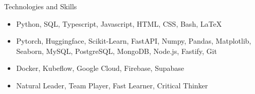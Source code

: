 \documentclass[]{mcdowellcv}
\begin{document}
	\begin{cvsection}{Technologies and Skills}
		\begin{cvsubsection}{}{}{}	
			\begin{itemize}
				\item Python, SQL, Typescript, Javascript, HTML, CSS, Bash, \LaTeX
				\item Pytorch, Huggingface, Scikit-Learn, FastAPI, Numpy, Pandas, Matplotlib, Seaborn, MySQL, PostgreSQL, MongoDB, Node.js, Fastify, Git
				\item Docker, Kubeflow, Google Cloud, Firebase, Supabase
				\item Natural Leader, Team Player, Fast Learner, Critical Thinker
			\end{itemize}
		\end{cvsubsection}
	\end{cvsection}
	
\end{document}
